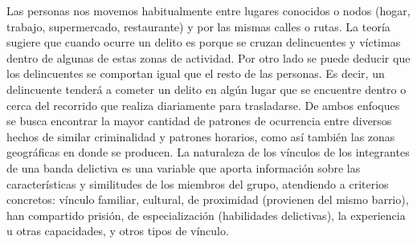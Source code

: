 Las personas nos movemos habitualmente entre lugares conocidos o nodos (hogar, trabajo, supermercado, restaurante) y por las mismas calles o rutas. La teoría sugiere que cuando ocurre un delito es porque se cruzan delincuentes y víctimas dentro de algunas de estas zonas de actividad.
Por otro lado se puede deducir que los delincuentes se comportan igual que el resto de las personas. Es decir, un delincuente tenderá a cometer un delito en algún lugar que se encuentre dentro o cerca del recorrido que realiza diariamente para trasladarse.
De ambos enfoques se busca encontrar la mayor cantidad de patrones de ocurrencia entre diversos hechos de similar criminalidad y patrones horarios, como así también las zonas geográficas en donde se producen.  
La naturaleza de los vínculos de los integrantes de una banda delictiva es una variable que aporta información sobre las características y similitudes de los miembros del grupo, atendiendo a criterios concretos: vínculo familiar, cultural, de proximidad (provienen del mismo barrio), han compartido prisión, de especialización (habilidades delictivas), la experiencia u otras capacidades, y otros tipos de vínculo.
